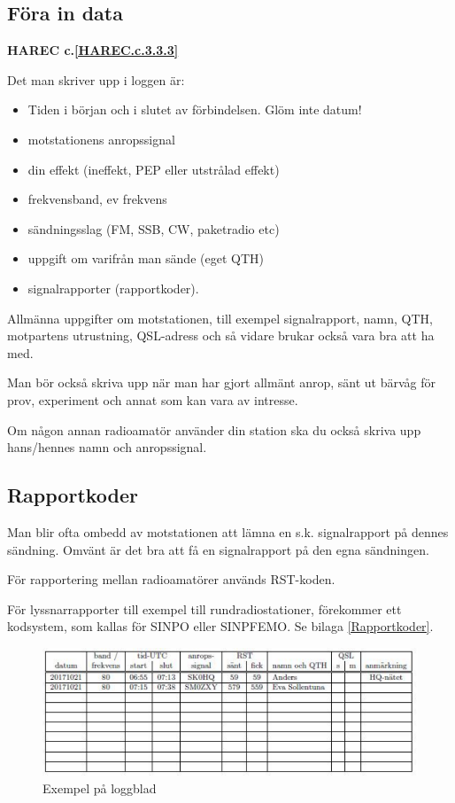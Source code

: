 \subsection{Föra in data}
\textbf{HAREC
  c.\ref{HAREC.c.3.3.3}\label{myHAREC.c.3.3.3}
}

Det man skriver upp i loggen är:
\begin{itemize}
  \item Tiden i början och i slutet av förbindelsen. Glöm inte datum!
  \item motstationens anropssignal
  \item din effekt (ineffekt, PEP eller utstrålad effekt)
  \item frekvensband, ev frekvens
  \item sändningsslag (FM, SSB, CW, paketradio etc)
  \item uppgift om varifrån man sände (eget QTH)
  \item signalrapporter (rapportkoder).
\end{itemize}

Allmänna uppgifter om motstationen, till exempel signalrapport, namn, QTH,
motpartens utrustning, QSL-adress och så vidare brukar också vara bra att ha med.

Man bör också skriva upp när man har gjort allmänt anrop, sänt ut
bärvåg för prov, experiment och annat som kan vara av intresse.

Om någon annan radioamatör använder din station ska du också skriva
upp hans/hennes namn och anropssignal.

\subsection{Rapportkoder}

Man blir ofta ombedd av motstationen att lämna en s.k. signalrapport på dennes
sändning.
Omvänt är det bra att få en signalrapport på den egna sändningen.

För rapportering mellan radioamatörer används RST-koden.

För lyssnarrapporter till exempel till rundradiostationer, förekommer ett
kodsystem, som kallas för SINPO eller SINPFEMO. Se bilaga \ref{Rapportkoder}.

\begin{figure}[ht]
	\includegraphics[width=\textwidth]{images/cropped_pdfs/bild_15_1-01.pdf}
	\caption{Exempel på loggblad}
	\label{loggblad}
\end{figure}
